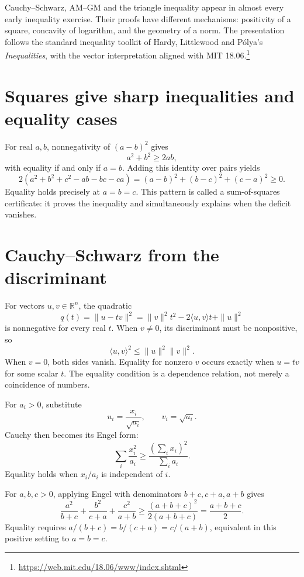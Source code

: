 
Cauchy--Schwarz, AM--GM and the triangle inequality appear in almost every early inequality exercise. Their proofs have different mechanisms: positivity of a square, concavity of logarithm, and the geometry of a norm. The presentation follows the standard inequality toolkit of Hardy, Littlewood and Pólya's \emph{Inequalities}, with the vector interpretation aligned with MIT 18.06.\footnote{\url{https://web.mit.edu/18.06/www/index.shtml}}

\section{Squares give sharp inequalities and equality cases}

For real \(a,b\), nonnegativity of \((a-b)^2\) gives
\[
 a^2+b^2\ge2ab,
\]
with equality if and only if \(a=b\). Adding this identity over pairs yields
\[
 2(a^2+b^2+c^2-ab-bc-ca)
 =(a-b)^2+(b-c)^2+(c-a)^2\ge0.
\]
Equality holds precisely at \(a=b=c\). This pattern is called a sum-of-squares certificate: it proves the inequality and simultaneously explains when the deficit vanishes.

\section{Cauchy--Schwarz from the discriminant}

For vectors \(u,v\in\mathbb R^n\), the quadratic
\[
 q(t)=\|u-tv\|^2
 =\|v\|^2t^2-2\langle u,v\rangle t+\|u\|^2
\]
is nonnegative for every real \(t\). When \(v\ne0\), its discriminant must be nonpositive, so
\[
 \langle u,v\rangle^2\le\|u\|^2\|v\|^2.
\]
When \(v=0\), both sides vanish. Equality for nonzero \(v\) occurs exactly when \(u=tv\) for some scalar \(t\). The equality condition is a dependence relation, not merely a coincidence of numbers.

For \(a_i>0\), substitute
\[
 u_i=\frac{x_i}{\sqrt{a_i}},\qquad v_i=\sqrt{a_i}.
\]
Cauchy then becomes its Engel form:
\[
 \boxed{\sum_i\frac{x_i^2}{a_i}\ge
 \frac{(\sum_i x_i)^2}{\sum_i a_i}.}
\]
Equality holds when \(x_i/a_i\) is independent of \(i\).

\begin{example}
For \(a,b,c>0\), applying Engel with denominators \(b+c,c+a,a+b\) gives
\[
 \frac{a^2}{b+c}+\frac{b^2}{c+a}+\frac{c^2}{a+b}
 \ge\frac{(a+b+c)^2}{2(a+b+c)}
 =\frac{a+b+c}{2}.
\]
Equality requires \(a/(b+c)=b/(c+a)=c/(a+b)\), equivalent in this positive setting to \(a=b=c\).
\end{example}


